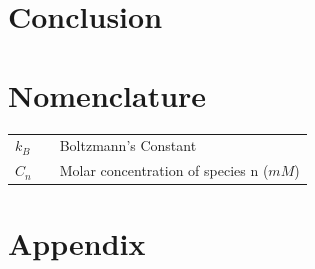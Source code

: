 \documentclass[10pt,a4paper,twoside]{article}
\begin{document}
\section{Conclusion} 
\section{Nomenclature} 
   \begin{tabulary}{1.0\textwidth}{LCL}
   $k_B$ & & Boltzmann's Constant\\
   $C_n$ &   & Molar concentration of species n ($mM$) \\
   \end{tabulary}


\vfill
\newpage
\section{Appendix}
\label{sec:appendix}
\setcounter{page}{1}
%
%
%
\end{document}
